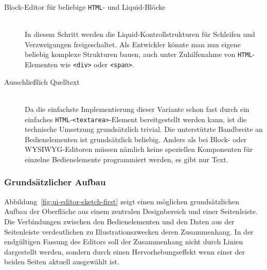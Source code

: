 \begin{description}
\item[ Block-Editor für beliebige \texttt{HTML}- und Liquid-Blöcke] \hfill \\
  In diesem Schritt werden die Liquid-Kontrollstrukturen für Schleifen und Verzweigungen freigeschaltet. Als Entwickler könnte man nun eigene beliebig komplexe Strukturen bauen, auch unter Zuhilfenahme von \texttt{HTML}-Elementen wie \texttt{<div>} oder \texttt{<span>}.
  
\item[ Ausschließlich Quelltext] \hfill \\
  Da die einfachste Implementierung dieser Variante schon fast durch ein einfaches \texttt{HTML}-\texttt{<textarea>}-Element bereitgestellt werden kann, ist die technische Umsetzung grundsätzlich trivial. Die unterstützte Bandbreite an Bedienelementen ist grundsätzlich beliebig. Anders als bei Block- oder WYSIWYG-Editoren müssen nämlich keine speziellen Komponenten für einzelne Bedienelemente programmiert werden, es gibt nur Text.
  
\end{description}

\subsubsection{Grundsätzlicher Aufbau}
\label{sec:design-ui-editor}


Abbildung~\ref{fig:ui-editor-sketch-first} zeigt einen möglichen grundsätzlichen Aufbau der Oberfläche aus einem zentralen Designbereich und einer Seitenleiste. Die Verbindungen zwischen den Bedienelementen und den Daten aus der Seitenleiste verdeutlichen zu Illustrationszwecken deren Zusammenhang. In der endgültigen Fassung des Editors soll der Zusammenhang nicht durch Linien dargestellt werden, sondern durch einen Hervorhebungseffekt wenn einer der beiden Seiten aktuell ausgewählt ist.


